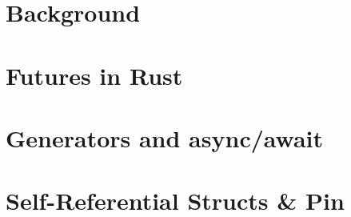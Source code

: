 \section{Background} %
\section{Futures in Rust} %
\section{Generators and async/await} %
\section{Self-Referential Structs \& Pin} %
